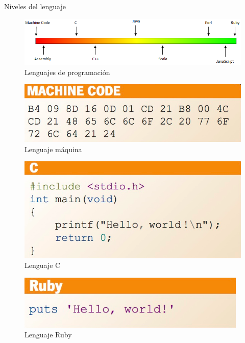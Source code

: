 \documentclass{beamer}
\begin{document}
\begin{frame}[t]{Niveles del lenguaje}\vspace{4pt}
\begin{figure}
	\centering
	\includegraphics[scale=0.4]{speclang}
	\caption{Lenguajes de programación}
\end{figure}
\begin{multicols}{3}
\begin{figure}
	\centering
	\includegraphics[scale=0.18]{mcode}
	\caption{Lenguaje máquina}
\end{figure}
\begin{figure}
	\centering
	\includegraphics[scale=0.18]{clang}
	\caption{Lenguaje C}
\end{figure}
\begin{figure}
	\centering
	\includegraphics[scale=0.26]{rubylang}
	\caption{Lenguaje Ruby}
\end{figure}
\end{multicols}
\end{frame}
\end{document}
